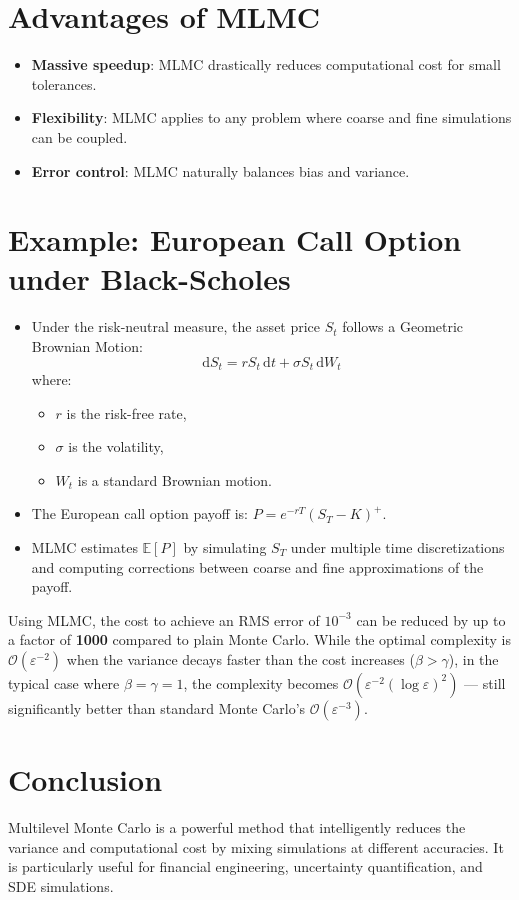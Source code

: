 \documentclass{article}
\begin{document}
\section{Advantages of MLMC}
\begin{itemize}
  \item \textbf{Massive speedup}: MLMC drastically reduces computational cost for small tolerances.
  \item \textbf{Flexibility}: MLMC applies to any problem where coarse and fine simulations can be coupled.
  \item \textbf{Error control}: MLMC naturally balances bias and variance.
\end{itemize}

\section{Example: European Call Option under Black-Scholes}
\begin{itemize}
  \item Under the risk-neutral measure, the asset price $S_t$ follows a Geometric Brownian Motion:
  \begin{equation}
  \mathrm{d}S_t = r S_t \,\mathrm{d}t + \sigma S_t \,\mathrm{d}W_t
  \end{equation}
  where:
  \begin{itemize}
    \item $r$ is the risk-free rate,
    \item $\sigma$ is the volatility,
    \item $W_t$ is a standard Brownian motion.
  \end{itemize}

  \item The European call option payoff is: $P = e^{-rT} (S_T - K)^+$.

  \item MLMC estimates $\mathbb{E}[P]$ by simulating $S_T$ under multiple time discretizations and computing corrections between coarse and fine approximations of the payoff.
\end{itemize}

Using MLMC, the cost to achieve an RMS error of $10^{-3}$ can be reduced by up to a factor of \textbf{1000} compared to plain Monte Carlo. While the optimal complexity is $\mathcal{O}(\varepsilon^{-2})$ when the variance decays faster than the cost increases ($\beta > \gamma$), in the typical case where $\beta = \gamma = 1$, the complexity becomes $\mathcal{O}(\varepsilon^{-2} (\log \varepsilon)^2)$ — still significantly better than standard Monte Carlo’s $\mathcal{O}(\varepsilon^{-3})$.

\section{Conclusion}
Multilevel Monte Carlo is a powerful method that intelligently reduces the variance and computational cost by mixing simulations at different accuracies.\newline
It is particularly useful for financial engineering, uncertainty quantification, and SDE simulations.
\end{document}
